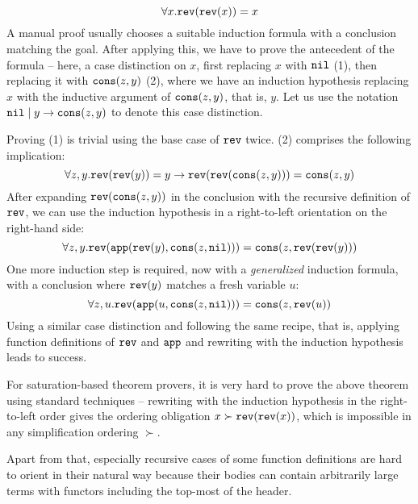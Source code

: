 \begin{example}\label{ex:1}
$$\forall x. \mathtt{rev}(\mathtt{rev}(x))=x$$
A manual proof usually chooses a suitable induction formula with a conclusion matching the goal. After applying this, we have to prove the antecedent of the formula -- here, a case distinction on $x$, first replacing $x$ with $\mathtt{nil}$ (1), then replacing it with $\mathtt{cons}(z,y)$ (2), where we have an induction hypothesis replacing $x$ with the inductive argument of $\mathtt{cons}(z,y)$, that is, $y$. Let us use the notation $\mathtt{nil} \mid y\rightarrow\mathtt{cons}(z,y)$ to denote this case distinction.

Proving (1) is trivial using the base case of $\mathtt{rev}$ twice. (2) comprises the following implication:
$$\forall z,y.\mathtt{rev}(\mathtt{rev}(y))=y\rightarrow\mathtt{rev}(\mathtt{rev}(\mathtt{cons}(z,y)))=\mathtt{cons}(z,y)$$
After expanding $\mathtt{rev}(\mathtt{cons}(z,y))$ in the conclusion with the recursive definition of $\mathtt{rev}$, we can use the induction hypothesis in a right-to-left orientation on the right-hand side:
$$\forall z,y.\mathtt{rev}(\mathtt{app}(\mathtt{rev}(y),\mathtt{cons}(z,\mathtt{nil})))=\mathtt{cons}(z,\mathtt{rev}(\mathtt{rev}(y)))$$
One more induction step is required, now with a \textit{generalized} induction formula, with a conclusion where $\mathtt{rev}(y)$ matches a fresh variable $u$:
$$\forall z,u.\mathtt{rev}(\mathtt{app}(u,\mathtt{cons}(z,\mathtt{nil})))=\mathtt{cons}(z,\mathtt{rev}(u))$$
Using a similar case distinction and following the same recipe, that is, applying function definitions of $\mathtt{rev}$ and $\mathtt{app}$ and rewriting with the induction hypothesis leads to success.
\end{example}

For saturation-based theorem provers, it is very hard to prove the above theorem using standard techniques -- rewriting with the induction hypothesis in the right-to-left order gives the ordering obligation $x \succ \mathtt{rev}(\mathtt{rev}(x))$, which is impossible in any simplification ordering $\succ$.

Apart from that, especially recursive cases of some function definitions are hard to orient in their natural way because their bodies can contain arbitrarily large terms with functors including the top-most of the header.

